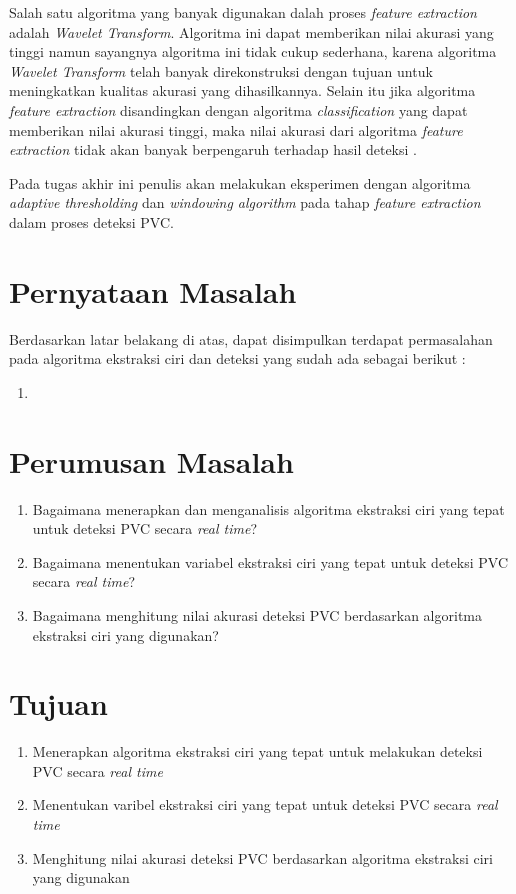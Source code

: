 Salah satu algoritma yang banyak digunakan dalah proses \textit{feature extraction} adalah \textit{Wavelet Transform}. Algoritma ini dapat memberikan nilai akurasi yang tinggi namun sayangnya algoritma ini tidak cukup sederhana, karena algoritma \textit{Wavelet Transform} telah banyak direkonstruksi dengan tujuan untuk meningkatkan kualitas akurasi yang dihasilkannya\cite{Ucuk}. Selain itu jika algoritma \textit{feature extraction} disandingkan dengan algoritma \textit{classification} yang dapat memberikan nilai akurasi tinggi, maka nilai akurasi dari algoritma \textit{feature extraction} tidak akan banyak berpengaruh terhadap hasil deteksi \cite{yasinKaya}.

Pada tugas akhir ini penulis akan melakukan eksperimen dengan algoritma  \textit{adaptive thresholding} dan \textit{windowing algorithm} pada tahap \textit{feature extraction} dalam proses deteksi PVC.  

\section{Pernyataan Masalah}
Berdasarkan latar belakang di atas, dapat disimpulkan terdapat permasalahan pada algoritma ekstraksi ciri dan deteksi yang sudah ada sebagai berikut :
\begin{enumerate}
	\item
\end{enumerate}

\section{Perumusan Masalah}
\begin{enumerate}
    \item Bagaimana menerapkan dan menganalisis algoritma ekstraksi ciri yang tepat untuk deteksi PVC secara \textit{real time}?
    \item Bagaimana menentukan variabel ekstraksi ciri yang tepat untuk deteksi PVC secara \textit{real time}?
    \item Bagaimana menghitung nilai akurasi deteksi PVC berdasarkan algoritma ekstraksi ciri yang digunakan?
\end{enumerate}

\section{Tujuan}
\begin{enumerate}
    \item Menerapkan algoritma ekstraksi ciri yang tepat untuk melakukan deteksi PVC secara \textit{real time}
    \item Menentukan varibel ekstraksi ciri yang tepat untuk deteksi PVC secara \textit{real time}
    \item Menghitung nilai akurasi deteksi PVC berdasarkan algoritma ekstraksi ciri yang digunakan
\end{enumerate}

